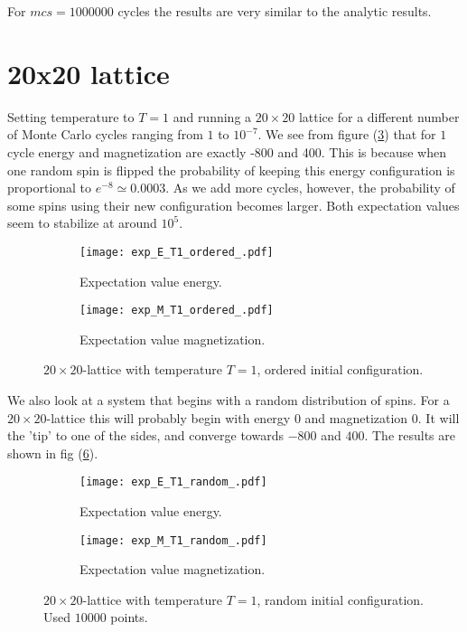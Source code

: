 \documentclass[11pt]{article}
\begin{document}
\begin{flushleft}
For $mcs = 1000000$ cycles the results are very similar to the analytic results. 
\end{flushleft}


\section{20x20 lattice}

\begin{flushleft}
Setting temperature to $T=1$ and running a $20 \times 20$ lattice for a different number of Monte Carlo cycles ranging from $1$ to $10^{-7}$. We see from figure (\ref{fig:cms-EM T=1}) that for $1$ cycle energy and magnetization are exactly -800 and 400. This is because when one random spin is flipped the probability of keeping this energy configuration is proportional to $e^{-8} \simeq 0.0003$. As we add more cycles, however, the probability of some spins using their new configuration becomes larger. Both expectation values seem to stabilize at around $10^5$.


\begin{figure}
\centering
\begin{subfigure}{.5\textwidth}
  \centering
  \texttt{[image: exp\_E\_T1\_ordered\_.pdf]}
  \caption{Expectation value energy.}
  \label{fig:sub1}
\end{subfigure}%
\begin{subfigure}{.5\textwidth}
  \centering
  \texttt{[image: exp\_M\_T1\_ordered\_.pdf]}
  \caption{Expectation value magnetization.}
  \label{fig:sub2}
\end{subfigure}
\caption{$20 \times 20$-lattice with temperature $T=1$, ordered initial configuration.}
\label{fig:cms-EM T=1}
\end{figure}

\end{flushleft}

\begin{flushleft}
We also look at a system that begins with a random distribution of spins. For a $20 \times 20$-lattice this will probably begin with energy $0$ and magnetization $0$. It will the 'tip' to one of the sides, and converge towards $-800$ and $400$. The results are shown in fig (\ref{fig:cms-EM T=1 random}).

\begin{figure}
\centering
\begin{subfigure}{.5\textwidth}
  \centering
  \texttt{[image: exp\_E\_T1\_random\_.pdf]}
  \caption{Expectation value energy.}
  \label{fig:sub1}
\end{subfigure}%
\begin{subfigure}{.5\textwidth}
  \centering
  \texttt{[image: exp\_M\_T1\_random\_.pdf]}
  \caption{Expectation value magnetization.}
  \label{fig:sub2}
\end{subfigure}
\caption{$20 \times 20$-lattice with temperature $T=1$, random initial configuration. Used $10000$ points.}
\label{fig:cms-EM T=1 random}
\end{figure}
\end{flushleft}
\end{document}
